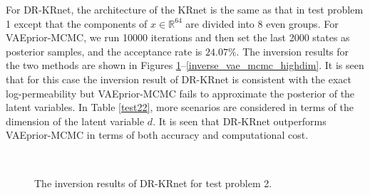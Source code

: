For DR-KRnet, the architecture of the KRnet is the same as that in test problem 1 except that the components of $x\in\mathbb{R}^{64}$ are divided into 8 even groups. %
For VAEprior-MCMC, %
 we run 10000 iterations and then set the last 2000 states as posterior samples,
 and the acceptance rate is $24.07\%$. The inversion results for the two methods are shown in Figures \ref{inverse_vae_highdim}--\ref{inverse_vae_mcmc_highdim}. It is seen that for this case the inversion result of DR-KRnet is consistent with the exact log-permeability but VAEprior-MCMC fails to approximate the posterior of the latent variables.  
 In Table \ref{test22}, more scenarios are considered in terms of the dimension of the latent variable $d$. It is seen that 
DR-KRnet outperforms VAEprior-MCMC in terms of both accuracy and computational cost.
\begin{figure}
	\centering
	\quad
	\quad
	\\
	\quad
   \quad {}
	\caption{The inversion results of DR-KRnet for test problem 2. }
    \label{inverse_vae_highdim}
\end{figure}


